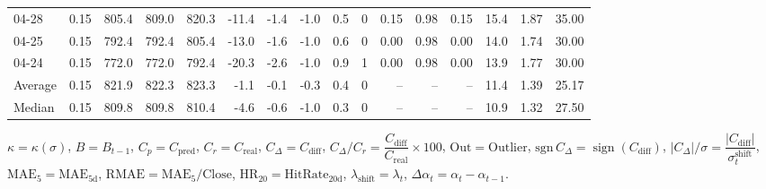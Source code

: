 \begin{threeparttable}
{\begin{tabular}{lrrrrrrrrrrrrrrr}
  04-28 &     0.15 & 805.4 & 809.0 & 820.3 &      -11.4 &           -1.4 &                     -1.0 &                 0.5 &              0 &       0.15 &      0.98 &           0.15 &             15.4 &            1.87 &                  35.00 \\
  04-25 &     0.15 & 792.4 & 792.4 & 805.4 &      -13.0 &           -1.6 &                     -1.0 &                 0.6 &              0 &       0.00 &      0.98 &           0.00 &             14.0 &            1.74 &                  30.00 \\
  04-24 &     0.15 & 772.0 & 772.0 & 792.4 &      -20.3 &           -2.6 &                     -1.0 &                 0.9 &              1 &       0.00 &      0.98 &           0.00 &             13.9 &            1.77 &                  30.00 \\
Average &     0.15 & 821.9 & 822.3 & 823.3 &       -1.1 &           -0.1 &                     -0.3 &                 0.4 &              0 &         -- &        -- &             -- &             11.4 &            1.39 &                  25.17 \\
 Median &     0.15 & 809.8 & 809.8 & 810.4 &       -4.6 &           -0.6 &                     -1.0 &                 0.3 &              0 &         -- &        -- &             -- &             10.9 &            1.32 &                  27.50 \\
\bottomrule
\end{tabular}
}
\begin{tablenotes}\footnotesize
\item $\kappa=\kappa(\sigma)$, $B=B_{t-1}$, $C_p=C_{\text{pred}}$, $C_r=C_{\text{real}}$, $C_\Delta=C_{\text{diff}}$, $C_\Delta/C_r=\dfrac{C_{\text{diff}}}{C_{\text{real}}}\times100$, $\mathrm{Out}=\text{Outlier}$, $\mathrm{sgn}\,C_\Delta=\operatorname{sign}(C_{\text{diff}})$, $|C_\Delta|/\sigma=\dfrac{|C_{\text{diff}}|}{\sigma_t^{\text{shift}}}$, $\mathrm{MAE}_5=\mathrm{MAE}_{5\text{d}}$, $\mathrm{RMAE}= \mathrm{MAE}_5 / \text{Close}$, $\mathrm{HR}_{20}=\mathrm{HitRate}_{20\text{d}}$, 
$\lambda_{\text{shift}}=\lambda_t$, 
$\Delta\alpha_t=\alpha_t-\alpha_{t-1}$.
\end{tablenotes}
\end{threeparttable}
\endgroup

